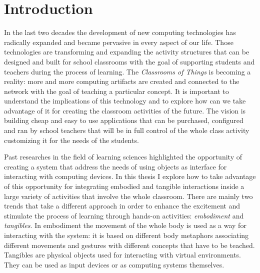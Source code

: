 \chapter{Introduction}

\label{chap:introduction}

In the last two decades the development of new computing technologies has radically expanded and became pervasive in every aspect of our life. Those technologies are transforming and expanding the activity structures that can be designed and built for school classrooms with the goal of supporting students and teachers during the process of learning. The \textit{Classrooms of Things} is becoming a reality: more and more computing artifacts are created and connected to the network with the goal of teaching a particular concept. It is important to understand the implications of this technology and to explore how can we take advantage of it for creating the classroom activities of the future. The vision is building cheap and easy to use applications that can be purchased, configured and ran by school teachers that will be in full control of the whole class activity customizing it for the needs of the students.

Past researches in the field of learning sciences highlighted the opportunity of creating a system that address the needs of using objects as interface for interacting with computing devices. In this thesis I explore how to take advantage of this opportunity for integrating embodied and tangible interactions inside a large variety of activities that involve the whole classroom. There are mainly two trends that take a different approach in order to enhance the excitement and stimulate the process of learning through hands-on activities: \textit{embodiment} and \textit{tangibles}. In embodiment the movement of the whole body is used as a way for interacting with the system: it is based on different body metaphors associating different movements and gestures with different concepts that have to be teached. Tangibles are physical objects used for interacting with virtual environments. They can be used as input devices or as computing systems themselves.

